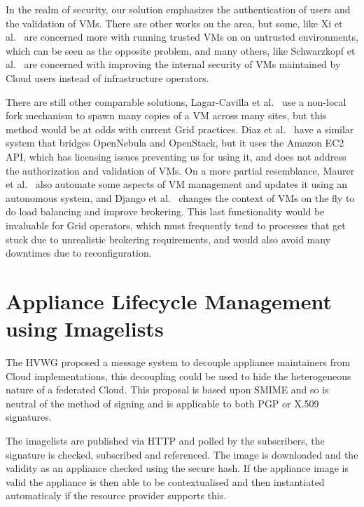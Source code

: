 \documentclass{cai}
\begin{document}
In the realm of security, our solution emphasizes the authentication of users and the validation of VMs. There are other works on the area, but some, like Xi et al.~\cite{Xi2012} are concerned more with running trusted VMs on on untrusted environments, which can be seen as the opposite problem, and many others, like Schwarzkopf et al.~\cite{Schwarzkopf2012} are concerned with improving the internal security of VMs maintained by Cloud users instead of infrastructure operators.

There are still other comparable solutions, Lagar-Cavilla et al.~\cite{Lagar-Cavilla2009} use a non-local fork mechanism to spawn many copies of a VM across many sites, but this method would be at odds with current Grid practices. Diaz et al.~\cite{Diaz2012} have a similar system that bridges OpenNebula and OpenStack, but it uses the Amazon EC2 API, which has licensing issues preventing us for using it, and does not address the authorization and validation of VMs. On a more partial resemblance, Maurer et al.~\cite{Maurer2013} also automate some aspects of VM management and updates it using an autonomous system, and Django et al.~\cite{Django2013} changes the context of VMs on the fly to do load balancing and improve brokering. This last functionality would be invaluable for Grid operators, which must frequently tend to processes that get stuck due to unrealistic brokering requirements, and would also avoid many downtimes due to reconfiguration.


\section{Appliance Lifecycle Management using Imagelists}
\label{sect-vmcaster}
The HVWG proposed a message system to decouple appliance maintainers from Cloud implementations, this decoupling could be used to hide the heterogeneous nature of a federated Cloud. 
This proposal is based upon SMIME and so is neutral of the method of signing and is applicable to both PGP or X.509 signatures.

The imagelists are published via HTTP and polled by the subscribers, the signature is checked, subscribed and referenced. The image is downloaded and the validity as an appliance checked using the secure hash. 
If the appliance image is valid the appliance is then able to be contextualised and then instantiated automaticaly if the resource provider supports this.
\end{document}
